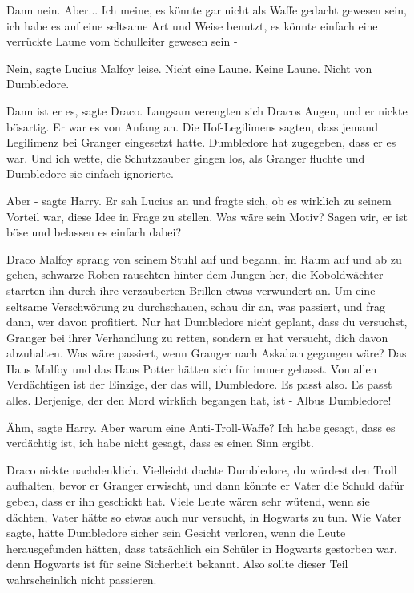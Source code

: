 \glqq{}Dann nein. Aber... Ich meine, es könnte gar nicht als Waffe gedacht
gewesen sein, ich habe es auf eine seltsame Art und Weise benutzt, es könnte
einfach eine verrückte Laune vom Schulleiter gewesen sein -\grqq{}

\glqq{}Nein\grqq{}, sagte Lucius Malfoy leise. \glqq{}Nicht eine Laune. Keine
Laune. Nicht von Dumbledore.\grqq{}

\glqq{}Dann ist er es\grqq{}, sagte Draco. Langsam verengten sich Dracos Augen,
und er nickte bösartig. \glqq{}Er war es von Anfang an. Die Hof-Legilimens
sagten, dass jemand Legilimenz bei Granger eingesetzt hatte. Dumbledore hat
zugegeben, dass er es war. Und ich wette, die Schutzzauber gingen los, als
Granger fluchte und Dumbledore sie einfach ignorierte.\grqq{}

\glqq{}Aber -\grqq{} sagte Harry. Er sah Lucius an und fragte sich, ob es
wirklich zu seinem Vorteil war, diese Idee in Frage zu stellen. \glqq{}Was wäre
sein Motiv? Sagen wir, er ist böse und belassen es einfach dabei?\grqq{}

Draco Malfoy sprang von seinem Stuhl auf und begann, im Raum auf und ab zu
gehen, schwarze Roben rauschten hinter dem Jungen her, die Koboldwächter
starrten ihn durch ihre verzauberten Brillen etwas verwundert an. \glqq{}Um eine
seltsame Verschwörung zu durchschauen, schau dir an, was passiert, und frag
dann, wer davon profitiert. Nur hat Dumbledore nicht geplant, dass du versuchst,
Granger bei ihrer Verhandlung zu retten, sondern er hat versucht, dich davon
abzuhalten. Was wäre passiert, wenn Granger nach Askaban gegangen wäre? Das Haus
Malfoy und das Haus Potter hätten sich für immer gehasst. Von allen Verdächtigen
ist der Einzige, der das will, Dumbledore. Es passt also. Es passt alles.
Derjenige, der den Mord wirklich begangen hat, ist - Albus Dumbledore!\grqq{}

\glqq{}Ähm\grqq{}, sagte Harry. \glqq{}Aber warum eine Anti-Troll-Waffe? Ich habe
gesagt, dass es verdächtig ist, ich habe nicht gesagt, dass es einen Sinn
ergibt.\grqq{}

Draco nickte nachdenklich. \glqq{}Vielleicht dachte Dumbledore, du würdest den
Troll aufhalten, bevor er Granger erwischt, und dann könnte er Vater die Schuld
dafür geben, dass er ihn geschickt hat. Viele Leute wären sehr wütend, wenn sie
dächten, Vater hätte so etwas auch nur versucht, in Hogwarts zu tun. Wie Vater
sagte, hätte Dumbledore sicher sein Gesicht verloren, wenn die Leute
herausgefunden hätten, dass tatsächlich ein Schüler in Hogwarts gestorben war,
denn Hogwarts ist für seine Sicherheit bekannt. Also sollte dieser Teil
wahrscheinlich nicht passieren.\grqq{}

